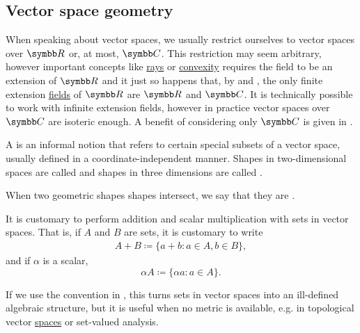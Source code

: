 \subsection{Vector space geometry}\label{subsec:vector_space_geometry}

\begin{remark}\label{remark:real_field_extensions}
  When speaking about vector spaces, we usually restrict ourselves to vector spaces over \( \BR \) or, at most, \( \BC \). This restriction may seem arbitrary, however important concepts like \hyperref[def:geometric_ray]{rays} or \hyperref[def:convex_set]{convexity} requires the field to be an extension of \( \BR \) and it just so happens that, by  and , the only finite extension \hyperref[def:field_extension]{fields} of \( \BR \) are \( \BR \) and \( \BC \). It is technically possible to work with infinite extension fields, however in practice vector spaces over \( \BC \) are isoteric enough. A benefit of considering only \( \BC \) is given in .
\end{remark}

\begin{definition}\label{def:geometric_shape}
  A  is an informal notion that refers to certain special subsets of a vector space, usually defined in a coordinate-independent manner. Shapes in two-dimensional spaces are called  and shapes in three dimensions are called .

  When two geometric shapes shapes intersect, we say that they are .
\end{definition}

\begin{remark}\label{remark:vector_space_set_operations}
  It is customary to perform addition and scalar multiplication with sets in vector spaces. That is, if \( A \) and \( B \) are sets, it is customary to write
  \begin{align*}
    A + B \coloneqq \{ a + b \colon a \in A, b \in B \},
  \end{align*}
  and if \( \alpha \) is a scalar,
  \begin{equation*}
    \alpha A \coloneqq \{ \alpha a \colon a \in A \}.
  \end{equation*}

  If we use the convention in , this turns sets in vector spaces into an ill-defined algebraic structure, but it is useful when no metric is available, e.g. in topological vector \hyperref[def:topological_vector_space]{spaces} or set-valued analysis.
\end{remark}

